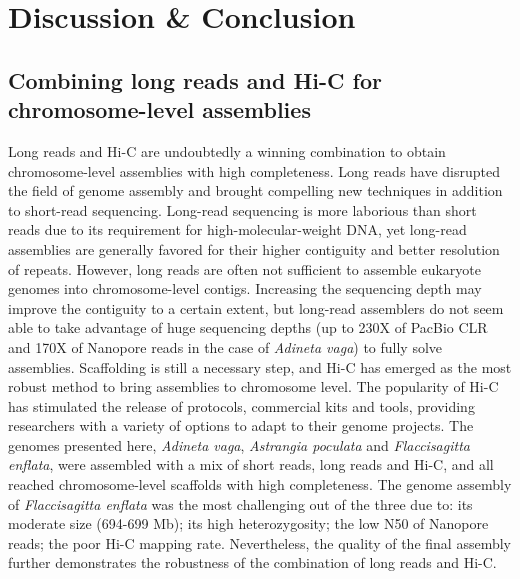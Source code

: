 \chapter{Discussion \& Conclusion}

\section{Combining long reads and Hi-C for chromosome-level assemblies}

Long reads and Hi-C are undoubtedly a winning combination to obtain chromosome-level assemblies with high completeness. Long reads have disrupted the field of genome assembly and brought compelling new techniques in addition to short-read sequencing. Long-read sequencing is more laborious than short reads due to its requirement for high-molecular-weight DNA, yet long-read assemblies are generally favored for their higher contiguity and better resolution of repeats. However, long reads are often not sufficient to assemble eukaryote genomes into chromosome-level contigs. Increasing the sequencing depth may improve the contiguity to a certain extent, but long-read assemblers do not seem able to take advantage of huge sequencing depths (up to 230X of PacBio CLR and 170X of Nanopore reads in the case of \textit{Adineta vaga}) to fully solve assemblies. Scaffolding is still a necessary step, and Hi-C has emerged as the most robust method to bring assemblies to chromosome level. The popularity of Hi-C has stimulated the release of protocols, commercial kits and tools, providing researchers with a variety of options to adapt to their genome projects. The genomes presented here, \textit{Adineta vaga}, \textit{Astrangia poculata} and \textit{Flaccisagitta enflata}, were assembled with a mix of short reads, long reads and Hi-C, and all reached chromosome-level scaffolds with high completeness. The genome assembly of \textit{Flaccisagitta enflata} was the most challenging out of the three due to: its moderate size (694-699 Mb); its high heterozygosity; the low N50 of Nanopore reads; the poor Hi-C mapping rate. Nevertheless, the quality of the final assembly further demonstrates the robustness of the combination of long reads and Hi-C. \\

